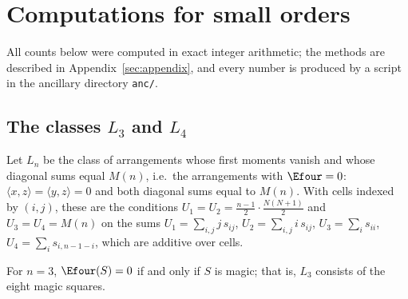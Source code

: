 \section{Computations for small orders}
\label{sec:computations}

All counts below were computed in exact integer arithmetic; the methods are described in Appendix~\ref{sec:appendix}, and every number is produced by a script in the ancillary directory \texttt{anc/}.

\subsection{The classes \texorpdfstring{$L_3$}{L3} and \texorpdfstring{$L_4$}{L4}}
\label{sec:lowmode_n4}

Let $L_n$ be the class of arrangements whose first moments vanish and whose diagonal sums equal $M(n)$, i.e.\ the arrangements with $\Efour=0$: $\langle x,z\rangle=\langle y,z\rangle=0$ and both diagonal sums equal to $M(n)$.
With cells indexed by $(i,j)$, these are the conditions $U_1=U_2=\frac{n-1}2\cdot\frac{N(N+1)}2$ and $U_3=U_4=M(n)$ on the sums
$U_1=\sum_{i,j}j\,s_{ij}$, $U_2=\sum_{i,j}i\,s_{ij}$, $U_3=\sum_is_{ii}$, $U_4=\sum_is_{i,n-1-i}$, which are additive over cells.

\begin{proposition}
\label{prop:n3_lowmode}
For $n=3$, $\Efour(S)=0$ if and only if $S$ is magic; that is, $L_3$ consists of the eight magic squares.
\end{proposition}

